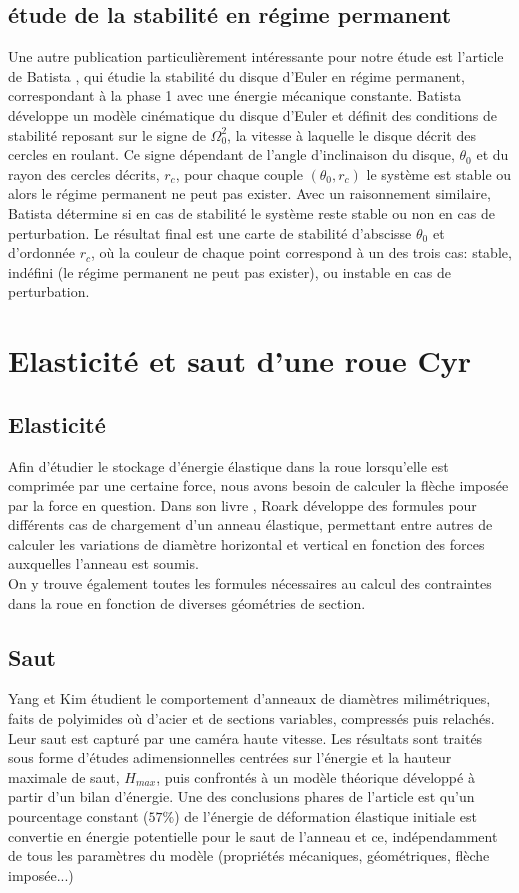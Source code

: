 \subsection{étude de la stabilité en régime permanent}
Une autre publication particulièrement intéressante pour notre étude est l'article de Batista \cite{Batista}, qui étudie la stabilité du disque d'Euler en régime permanent, correspondant à la phase 1 avec une énergie mécanique constante. Batista développe un modèle cinématique du disque d'Euler et définit des conditions de stabilité reposant sur le signe de $\Omega_0^2$, la vitesse à laquelle le disque décrit des cercles en roulant. Ce signe dépendant de l'angle d'inclinaison du disque, $\theta_0$ et du rayon des cercles décrits, $r_c$, pour chaque couple $(\theta_0,r_c)$ le système est stable ou alors le régime permanent ne peut pas exister. Avec un raisonnement similaire, Batista détermine si en cas de stabilité le système reste stable ou non en cas de perturbation. Le résultat final est une carte de stabilité d'abscisse $\theta_0$ et d'ordonnée $r_c$, où la couleur de chaque point correspond à un des trois cas: stable, indéfini (le régime permanent ne peut pas exister), ou instable en cas de perturbation.

\section{Elasticité et saut d'une roue Cyr}
\subsection{Elasticité}
Afin d’étudier le stockage d’énergie élastique dans la roue lorsqu’elle est comprimée par une certaine force, nous avons besoin de calculer la flèche imposée par la force en question. Dans son livre \cite{roark}, Roark développe des formules pour différents cas de chargement d’un anneau élastique, permettant entre autres de calculer les variations de diamètre horizontal et vertical en fonction des forces auxquelles l’anneau est soumis. \\
On y trouve également toutes les formules nécessaires au calcul des contraintes dans la roue en fonction de diverses géométries de section.

\subsection{Saut}
 Yang et Kim \cite{yangkim} étudient le comportement d'anneaux de diamètres milimétriques, faits de polyimides où d'acier et de sections variables, compressés puis relachés. Leur saut est capturé par une caméra haute vitesse. Les résultats sont traités sous forme d'études adimensionnelles centrées sur l'énergie et la hauteur maximale de saut, $H_{max}$, puis confrontés à un modèle théorique développé à partir d'un bilan d'énergie. Une des conclusions phares de l'article est qu'un pourcentage constant ($57\%$) de l'énergie de déformation élastique initiale est convertie en énergie potentielle pour le saut de l'anneau et ce, indépendamment de tous les paramètres du modèle (propriétés mécaniques, géométriques, flèche imposée...)